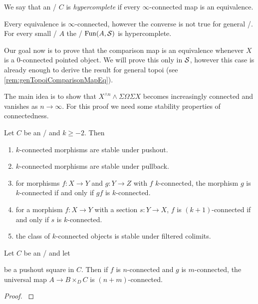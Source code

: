 \begin{definition}
    We say that an \inftytop/ $C$ is \emph{hypercomplete} if every $\infty$-connected map is an equivalence.
\end{definition}
\begin{remark}
    Every equivalence is $\infty$-connected, however the converse is not true for general \inftytops/.
    For every small \inftycat/ $A$ the \inftytop/ $\operatorname{Fun}(A,\mathcal{S})$ is hypercomplete. %
\end{remark}
Our goal now is to prove that the comparison map is an equivalence whenever $X$ is a $0$-connected pointed object.
We will prove this only in $\mathcal{S}$, however this case is already enough to derive the result for general topoi (see \cref{rem:genTopoiComparisonMapEq}).

The main idea is to show that $X^{\wedge n}\wedge\Sigma\Omega\Sigma X$ becomes increasingly connected and vanishes as $n\to\infty$.
For this proof we need some stability properties of connectedness.
\begin{prop}\label{prop:conn}
    Let $C$ be an \inftytop/ and $k\geq -2$.
    Then
    \begin{enumerate}[label={(\roman*)}]
        \item $k$-connected morphisms are stable under pushout. \label{prop:connStableUnderPo}
        \item $k$-connected morphisms are stable under pullback.\label{prop:connStableUnderPb}
        \item for morphisms $f\colon X\to Y$ and $g\colon Y\to Z$ with $f$ $k$-connected, the morphism $g$ is $k$-connected if and only if $gf$ is $k$-connected. \label{prop:connRightCancel}
        \item for a morphism $f\colon X\to Y$ with a section $s\colon Y\to X$, $f$ is $(k+1)$-connected if and only if $s$ is $k$-connected. \label{prop:connSection}
        \item the class of $k$-connected objects is stable under filtered colimits. \label{prop:connStableFilteredColim}
    \end{enumerate}
    \begin{reference}
        \cite[Proposition 4.10]{splittings_21}
    \end{reference}
\end{prop}
\begin{prop}\label{prop:blakersMassay}
    Let $C$ be an \inftytop/ and let 
    \begin{center}
    \end{center}
    be a pushout square in $C$.
    Then if $f$ is $n$-connected and $g$ is $m$-connected, the universal map $A\to B\times_{D}C$ is $(n+m)$-connected.
    \begin{proof}
        \cite[Corollary 4.3.1]{gen_blakers_massey}
    \end{proof}
\end{prop}
